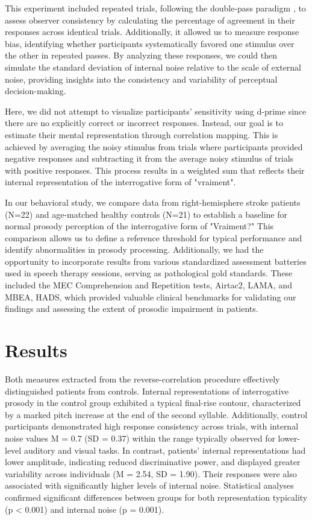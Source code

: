 This experiment included repeated trials, following the double-pass paradigm \cite{burgess_visual_1988}, to assess observer consistency by calculating the percentage of agreement in their responses across identical trials. Additionally, it allowed us to measure response bias, identifying whether participants systematically favored one stimulus over the other in repeated passes. By analyzing these responses, we could then simulate the standard deviation of internal noise relative to the scale of external noise, providing insights into the consistency and variability of perceptual decision-making. 

Here, we did not attempt to visualize participants' sensitivity using d-prime since there are no explicitly correct or incorrect responses. Instead, our goal is to estimate their mental representation through correlation mapping. This is achieved by averaging the noisy stimulus from trials where participants provided negative responses and subtracting it from the average noisy stimulus of trials with positive responses. This process results in a weighted sum that reflects their internal representation of the interrogative form of "vraiment".

In our behavioral study, we compare data from right-hemisphere stroke patients (N=22) and age-matched healthy controls (N=21) to establish a baseline for normal prosody perception of the interrogative form of "Vraiment?" This comparison allows us to define a reference threshold for typical performance and identify abnormalities in prosody processing. Additionally, we had the opportunity to incorporate results from various standardized assessment batteries used in speech therapy sessions, serving as pathological gold standards. These included the MEC Comprehension and Repetition tests, Airtac2, LAMA, and MBEA, HADS, which provided valuable clinical benchmarks for validating our findings and assessing the extent of prosodic impairment in patients.

\section{Results}
Both measures extracted from the reverse-correlation procedure effectively distinguished patients from controls. Internal representations of interrogative prosody in the control group exhibited a typical final-rise contour, characterized by a marked pitch increase at the end of the second syllable. Additionally, control participants demonstrated high response consistency across trials, with internal noise values M = 0.7 (SD = 0.37) within the range typically observed for lower-level auditory and visual tasks. In contrast, patients' internal representations had lower amplitude, indicating reduced discriminative power, and displayed greater variability across individuals (M = 2.54, SD = 1.90). Their responses were also associated with significantly higher levels of internal noise. Statistical analyses confirmed significant differences between groups for both representation typicality (p < 0.001) and internal noise (p = 0.001).


